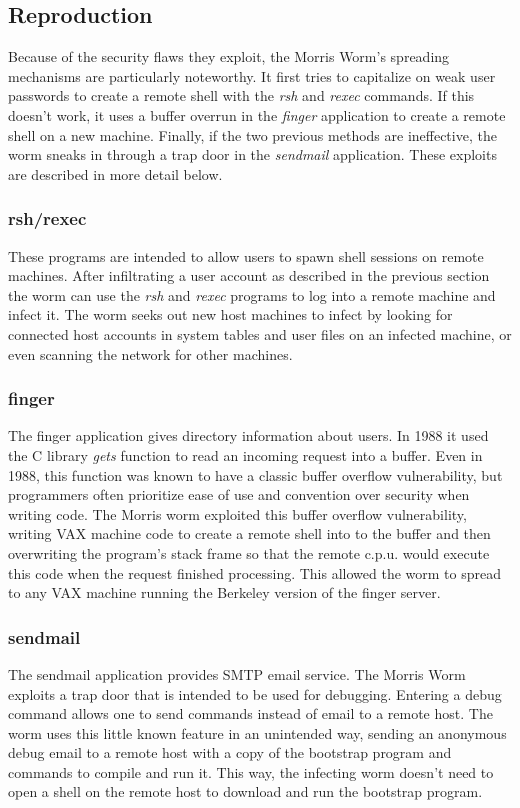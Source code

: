 \subsection*{Reproduction}
Because of the security flaws they exploit, the Morris Worm's spreading
mechanisms are particularly noteworthy. It first tries to capitalize on weak
user passwords to create a remote shell with the \textit{rsh} and \textit{rexec}
commands.
If this doesn't work, it uses a buffer overrun in the \textit{finger}
application to create a remote shell on a new machine. Finally, if the two
previous methods are ineffective, the worm sneaks in through a trap door in the
\textit{sendmail} application. These exploits are described in more detail
below.
\subsubsection*{rsh/rexec}
These programs are intended to allow users to spawn shell sessions on remote
machines. After infiltrating a user account as described in the previous
section the worm can use the \textit{rsh} and \textit{rexec} programs to log
into a remote machine and infect it. The worm seeks out new host machines to
infect by looking for connected host accounts in
system tables and user files on an infected machine, or even scanning the
network for other machines.

\subsubsection*{finger}
The finger application gives directory information about users. In 1988 it used
the C library \textit{gets} function to read an incoming request into a buffer.
Even in 1988, this function was known to have a classic buffer overflow
vulnerability, but programmers often prioritize ease of use and convention over security when
writing code. The Morris worm exploited this buffer overflow vulnerability,
writing VAX machine code to create a remote shell into to the buffer and then
overwriting the program's stack frame so that the remote c.p.u. would execute
this code when the request finished processing. This allowed the worm to spread
to any VAX machine running the Berkeley version of the finger server.

\subsubsection*{sendmail}
The sendmail application provides SMTP email service. The Morris Worm exploits
a trap door that is intended to be used for debugging. Entering a debug command
allows one to send commands instead of email to a remote host. The worm uses
this little known feature in an unintended way, sending an anonymous debug email
to a remote host with a copy of the bootstrap program and commands to compile and run
it. This way, the infecting worm doesn't need to open a shell on the remote host
to download and run the bootstrap program.



